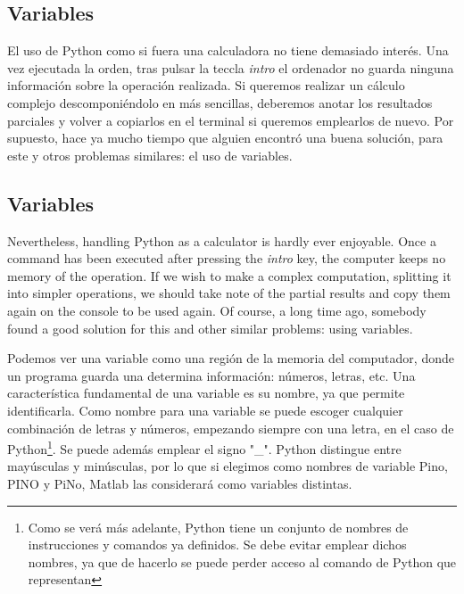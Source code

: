 \begin{paracol}{2}
\subsection{Variables}
El uso de Python como si fuera una calculadora no tiene demasiado interés. Una vez ejecutada la orden, tras pulsar la teccla \emph{intro} el ordenador no guarda ninguna información sobre la operación realizada. Si queremos realizar un cálculo complejo descomponiéndolo en más sencillas, deberemos anotar los resultados parciales y volver a copiarlos en el terminal si queremos emplearlos de nuevo. Por supuesto, hace ya mucho tiempo que alguien encontró una buena solución, para este y otros problemas similares: el uso de variables.

\switchcolumn
\subsection{Variables}
Nevertheless, handling Python as a calculator is hardly ever enjoyable. Once a command has been executed after pressing the \emph{intro} key, the computer keeps no memory of the operation. If we wish to make a complex computation, splitting it into simpler operations, we should take note of the partial results and copy them again on the console to be used again. Of course, a long time ago, somebody found a good solution for this and other similar problems: using variables.

\switchcolumn
Podemos ver una variable como una región de la memoria del computador, donde un programa guarda una determina información: números, letras, etc. Una característica fundamental de una variable es su nombre, ya que permite identificarla.  Como nombre para una variable se puede escoger cualquier combinación de letras y números, empezando siempre con una letra, en el caso de Python\footnote{Como se verá más adelante, Python tiene un conjunto de nombres de instrucciones y comandos ya definidos. Se debe evitar emplear dichos nombres, ya que de hacerlo se puede perder acceso al comando de Python que representan}. Se puede además emplear el signo "\_". Python distingue entre mayúsculas y minúsculas, por lo que si elegimos como nombres de variable Pino, PINO y PiNo, Matlab las considerará como variables distintas. 


\end{paracol}
